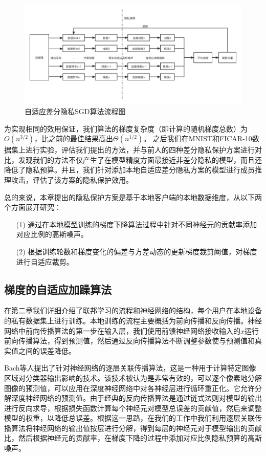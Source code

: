 \begin{figure}[!hbt]
\centering
	\includegraphics[scale=0.2]{fig2/C3/自适应差分隐私流程图}%
	\caption{自适应差分隐私SGD算法流程图}
	\label{fig:自适应差分隐私SGD算法流程图}	
\end{figure}

为实现相同的效用保证，我们算法的梯度复杂度（即计算的随机梯度总数）为$O\left(n^{3 / 2}\right)$，比之前的最佳结果高出$\Theta\left(n^{1 / 2}\right)$。 之后我们在MNIST和FICAR-10数据集上进行实验，评估我们提出的方法，并与前人的四种差分隐私保护方案进行对比，发现我们的方法不仅产生了在模型精度方面最接近非差分隐私的模型，而且还降低了隐私预算。并且，我们针对添加本地自适应差分隐私方案的模型进行成员推理攻击，评估了该方案的隐私保护效用。

总的来说，本章提出的隐私保护方案是基于本地客户端的本地数据维度，从以下两个方面展开研究：
\begin{enumerate}
\item [(1)] 通过在本地模型训练的梯度下降算法过程中针对不同神经元的贡献率添加对应比例的高斯噪声。
\item [(2)] 根据训练轮数和梯度变化的偏差与方差动态的更新梯度裁剪阈值，对梯度进行自适应裁剪。
\end{enumerate}

\subsection{梯度的自适应加躁算法}
在第二章我们详细介绍了联邦学习的流程和神经网络的结构，每个用户在本地设备的私有数据集上进行训练。本地训练的流程主要概括为前向传播和反向传播。神经网络中前向传播算法的第一步在输入层，我们使用前馈神经网络接收输入的$x$运行前向传播算法，得到预测值，然后通过反向传播算法不断调整参数使与预测值和真实值之间的误差降低。

Bach等人提出了针对神经网络的逐层关联传播算法，这是一种用于计算特定图像区域对分类器输出影响的技术。该技术被认为是非常有效的，可以逐个像素地分解图像的预测值，可以应用在深度神经网络中对各神经层进行循环重正化。它允许分解深度神经网络的预测值。由于经典的反向传播算法是通过链式法则对模型的输出进行反向求导，根据损失函数计算每个神经元对模型总误差的贡献值，然后来调整模型的权重，以降低总误差。根据这一思路，在我们的工作中我们利用逐层关联传播算法将神经网络的输出值按层进行分解，得到每层的神经元对于模型输出的贡献比，然后根据神经元的贡献率，在梯度下降的过程中添加对应比例隐私预算的高斯噪声。

